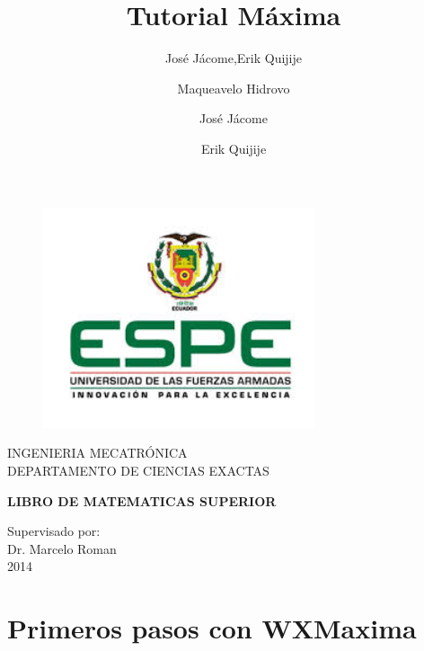\documentclass[10pt,a4paper]{book}
\author{José Jácome,Erik Quijije}
\title{Tutorial Máxima}
\begin{document}
\begin{titlepage}
 \begin{center}
  \vspace*{-1in}
  \begin{figure}[htb]
   \begin{center}
    \includegraphics[width=8cm]{espe.jpg}
   \end{center}
 \end{figure}

  INGENIERIA MECATRÓNICA\\
  \vspace*{0.15in}
  DEPARTAMENTO DE CIENCIAS EXACTAS\\
  \vspace*{0.6in}
  \begin{Large}
   \textbf{LIBRO DE MATEMATICAS SUPERIOR} \\
   \author{Maqueavelo Hidrovo}
   \author{José Jácome}
   \author{Erik Quijije}
  \end{Large}
  \vspace*{0.3in}
  \begin{large}
   Supervisado por: \\
   Dr. Marcelo Roman \\
   2014\\
  \end{large}
 \end{center}
\end{titlepage}

\chapter{Primeros pasos con WXMaxima}
\end{document}

